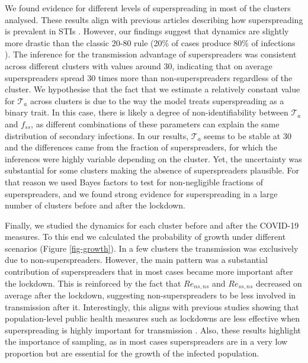 \documentclass[lineno,pdflatex,sn-nature]{sn-jnl}%
\theoremstyle{thmstyleone}%
\theoremstyle{thmstyletwo}%
\theoremstyle{thmstylethree}%
\begin{document}
We found evidence for different levels of superspreading in most of the clusters analysed. These results align with previous articles describing how superspreading is prevalent in STIs \cite{RefWorks:grassly2008mathematical}. However, our findings suggest that dynamics are slightly more drastic than the classic 20-80 rule (20\% of cases produce 80\% of infections \cite{RefWorks:lloyd-smith2005superspreading}). The inference for the transmission advantage of superspreaders was consistent across different clusters with values around 30, indicating that on average superspreaders spread 30 times more than non-superspreaders regardless of the cluster. We hypothesise that the fact that we estimate a relatively constant value for $\mathcal{T}_a$ across clusters  is due to the way the model treats superspreading as a binary trait. In this case, there is likely a degree of non-identifiability between $\mathcal{T}_a$ and $f_{ss}$, as different combinations of these parameters can explain the same distribution of secondary infections. In our results, $\mathcal{T}_a$ seems to be stable at 30 and the differences came from the fraction of superspreaders, for which the inferences were highly variable depending on the cluster. Yet, the uncertainty was substantial for some clusters making the absence of superspreaders plausible. For that reason we used Bayes factors to test for non-negligible fractions of superspreaders, and we found strong evidence for superspreading in a large number of clusters before and after the lockdown. \newline

Finally, we studied the dynamics for each cluster before and after the COVID-19 measures. To this end we calculated the probability of growth under different scenarios (Figure \ref{fig-growth}). In a few clusters the transmission was exclusively due to non-superspreaders. However, the main pattern was a substantial contribution of superspreaders that in most cases became more important after the lockdown. This is reinforced by the fact that $Re_{ns,ns}$ and $Re_{ss,ns}$ decreased on average after the lockdown, suggesting non-superspreaders to be less involved in transmission after it. Interestingly, this aligns with previous studies showing that population-level public health measures such as lockdowns are less effective when superspreading is highly important for transmission \cite{RefWorks:lloyd-smith2005superspreading}. Also, these results highlight the importance of sampling, as in most cases superspreaders are in a very low proportion but are essential for the growth of the infected population. \newline
\end{document}
